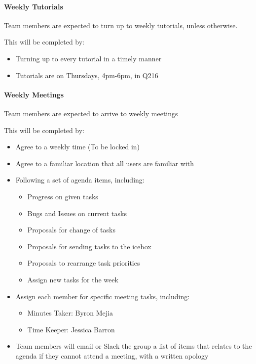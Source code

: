 \documentclass[12pt, a4paper, onecolumn]{article}
\begin{document}
\paragraph{Weekly Tutorials}
Team members are expected to turn up to weekly tutorials, unless
otherwise.

This will be completed by:
\begin{itemize}
  \setlength\itemsep{1px}
  \item Turning up to every tutorial in a timely manner
  \item Tutorials are on Thursdays, 4pm-6pm, in Q216
\end{itemize}

\paragraph{Weekly Meetings}
Team members are expected to arrive to weekly meetings

This will be completed by:
\begin{itemize}
  \setlength\itemsep{1px}
  \item Agree to a weekly time (To be locked in)
  \item Agree to a familiar location that all users are familiar with
  \item Following a set of agenda items, including:
  \begin{itemize}
    \setlength\itemsep{1px}
    \item Progress on given tasks
    \item Bugs and Issues on current tasks
    \item Proposals for change of tasks
    \item Proposals for sending tasks to the icebox
    \item Proposals to rearrange task priorities
    \item Assign new tasks for the week
  \end{itemize}
  \item Assign each member for specific meeting tasks, including:
  \begin{itemize}
    \setlength\itemsep{1px}
    \item Minutes Taker: Byron Mejia
    \item Time Keeper: Jessica Barron
  \end{itemize}
  \item Team members will email or Slack the group a list of
  items that relates to the agenda if they cannot attend a meeting,
  with a written apology
\end{itemize}
\end{document}
